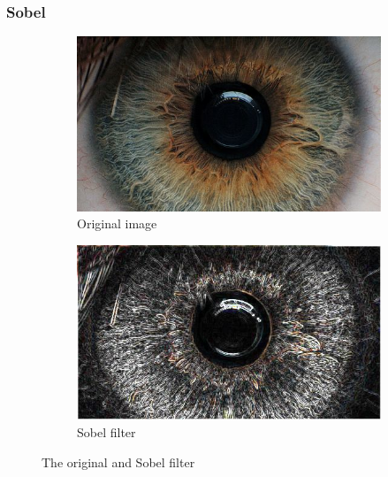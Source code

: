 \documentclass{article}
\begin{document}
\subsubsection{Sobel}


\begin{figure}[H]
\centering

\begin{subfigure}{.5\textwidth}
  \centering
  \includegraphics[width=0.9\linewidth]{res/index.jpg}
  \caption{Original image}
  \label{fig:original_img}
\end{subfigure}%
\begin{subfigure}{.5\textwidth}
  \centering
  \includegraphics[width=0.9\linewidth]{res/sobel.jpg}
  \caption{Sobel filter}
  \label{fig:gray_img}
\end{subfigure}

\caption{The original and Sobel filter}
\label{fig:source_img}
\end{figure}
\end{document}

